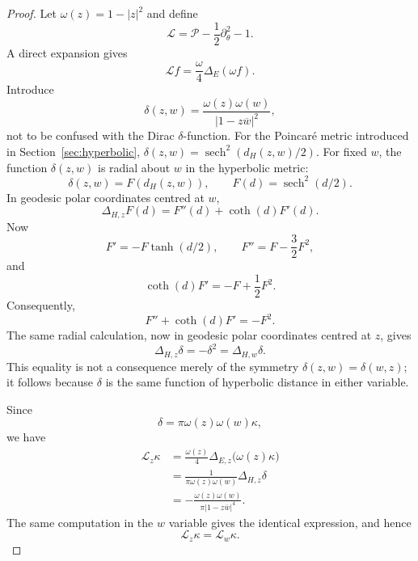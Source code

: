 \IfFileExists{iopjournal.cls}{\documentclass{iopjournal}}{\documentclass{iopjournal-draft}}
\theoremstyle{definition}
\theoremstyle{remark}
\newcommand{\sech}{\operatorname{sech}}
\numberwithin{equation}{section}
\begin{document}
\begin{proof}
Let $\omega(z)=1-|z|^2$ and define
\begin{equation}
 \mathcal L=\mathcal P-\frac12\partial_\theta^2-1.
 \label{eq:L-def}
\end{equation}
A direct expansion gives
\begin{equation}
 \mathcal Lf=\frac{\omega}{4}\Delta_E(\omega f).
 \label{eq:L-euclidean}
\end{equation}
Introduce
\begin{equation}
 \delta(z,w)=\frac{\omega(z)\omega(w)}{|1-z\overline w|^2},
 \label{eq:delta}
\end{equation}
not to be confused with the Dirac $\delta$-function. For the Poincar\'e metric introduced in Section~\ref{sec:hyperbolic}, $\delta(z,w)=\sech^2(d_H(z,w)/2)$.  
For fixed $w$, the function $\delta(z,w)$ is radial about $w$ in the
hyperbolic metric:
\begin{equation}
\delta(z,w)=F(d_H(z,w)),
\qquad
F(d)=\sech^2(d/2).
\end{equation}
In geodesic polar coordinates centred at $w$,
\begin{equation}
\Delta_{H,z}F(d)=F''(d)+\coth(d)F'(d).
\end{equation}
Now
\begin{equation}
F'=-F\tanh(d/2),
\qquad
F''=F-\frac32F^2,
\end{equation}
and
\begin{equation}
\coth(d)F'
=
-F+\frac12F^2.
\end{equation}
Consequently,
\begin{equation}
F''+\coth(d)F'=-F^2.
\end{equation}
The same radial calculation, now in geodesic polar coordinates centred
at $z$, gives
\begin{equation}
\Delta_{H,z}\delta
=
-\delta^2
=
\Delta_{H,w}\delta.
\end{equation}
This equality is not a consequence merely of the symmetry
$\delta(z,w)=\delta(w,z)$; it follows because $\delta$ is the same
function of hyperbolic distance in either variable.

Since
\begin{equation}
\delta=\pi\omega(z)\omega(w)\kappa,
\end{equation}
we have
\begin{equation}\label{eq:L-kernel}
\begin{aligned}
	\mathcal L_z\kappa
	&=
	\frac{\omega(z)}4
	\Delta_{E,z}\bigl(\omega(z)\kappa\bigr)\\
	&=
	\frac{1}{\pi\omega(z)\omega(w)}
	\Delta_{H,z}\delta\\
	&=
	-\frac{\omega(z)\omega(w)}
	{\pi|1-z\overline w|^4}.
\end{aligned}
\end{equation}
The same computation in the $w$ variable gives the identical
expression, and hence
\begin{equation}
\mathcal L_z\kappa=\mathcal L_w\kappa.
\end{equation}


\end{proof}
\end{document}
